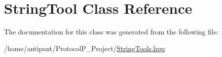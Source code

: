 \hypertarget{classStringTool}{\section{String\-Tool Class Reference}
\label{classStringTool}
}


The documentation for this class was generated from the following file\-:\begin{DoxyCompactItemize}
\item 
/home/antipant/\-Protocol\-P\-\_\-\-Project/\hyperlink{StringTools_8hpp}{String\-Tools.\-hpp}\end{DoxyCompactItemize}
